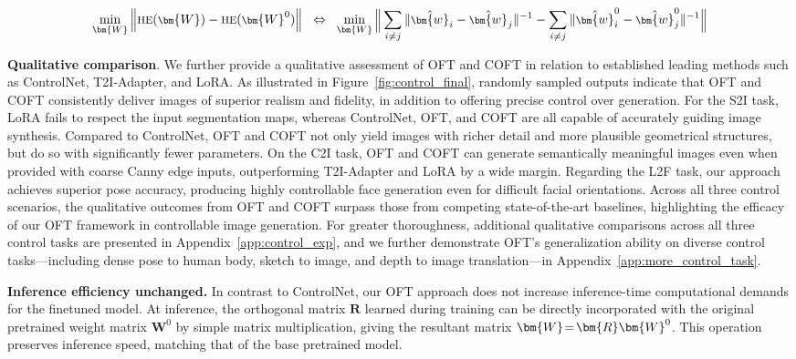 \begin{equation}\label{eq:oft_principle}
\footnotesize
\min_{\bm{W}} \left\| \text{HE}(\bm{W})-\text{HE}(\bm{W}^0)\right\|~~\Leftrightarrow~~\min_{\bm{W}} \bigg{\|} \sum_{i\neq j} \|\hat{\bm{w}}_i-\hat{\bm{w}}_j\|^{-1}-\sum_{i\neq j} \|\hat{\bm{w}}^0_i-\hat{\bm{w}}^0_j\|^{-1}\bigg{\|}
\end{equation}

\textbf{Qualitative comparison}. We further provide a qualitative assessment of OFT and COFT in relation to established leading methods such as ControlNet, T2I-Adapter, and LoRA. As illustrated in Figure~\ref{fig:control_final}, randomly sampled outputs indicate that OFT and COFT consistently deliver images of superior realism and fidelity, in addition to offering precise control over generation. For the S2I task, LoRA fails to respect the input segmentation maps, whereas ControlNet, OFT, and COFT are all capable of accurately guiding image synthesis. Compared to ControlNet, OFT and COFT not only yield images with richer detail and more plausible geometrical structures, but do so with significantly fewer parameters. On the C2I task, OFT and COFT can generate semantically meaningful images even when provided with coarse Canny edge inputs, outperforming T2I-Adapter and LoRA by a wide margin. Regarding the L2F task, our approach achieves superior pose accuracy, producing highly controllable face generation even for difficult facial orientations. Across all three control scenarios, the qualitative outcomes from OFT and COFT surpass those from competing state-of-the-art baselines, highlighting the efficacy of our OFT framework in controllable image generation. For greater thoroughness, additional qualitative comparisons across all three control tasks are presented in Appendix~\ref{app:control_exp}, and we further demonstrate OFT’s generalization ability on diverse control tasks—including dense pose to human body, sketch to image, and depth to image translation—in Appendix~\ref{app:more_control_task}.

\textbf{Inference efficiency unchanged.} In contrast to ControlNet, our OFT approach does not increase inference-time computational demands for the finetuned model. At inference, the orthogonal matrix $\bm{R}$ learned during training can be directly incorporated with the original pretrained weight matrix $\bm{W}^0$ by simple matrix multiplication, giving the resultant matrix $\thickmuskip=2mu \medmuskip=2mu \bm{W}=\bm{R}\bm{W}^0$. This operation preserves inference speed, matching that of the base pretrained model.

